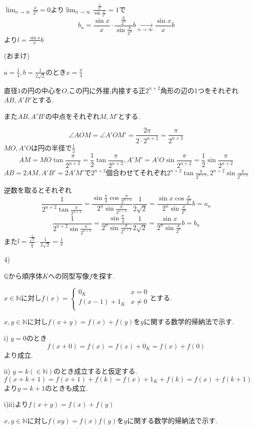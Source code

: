 \documentclass{jsarticle}
\begin{document}
$\displaystyle \lim_{n\to\infty}\frac{x}{2^n}=0$より$\displaystyle \lim_{n\to\infty}\frac{\frac{x}{2^n}}{\sin \frac{x}{2^n}}=1$で
\[b_n= \frac{\sin x}{x}\cdot\frac{\frac{x}{2^n}}{\sin \frac{x}{2^n}}b\xrightarrow[n\to\infty]{} \frac{\sin x}{x}b\]
より$l=\frac{\sin x}{x}b$

(おまけ)

$a=\frac{1}{4},b=\frac{1}{2\sqrt{2}}$のとき$x=\frac{\pi}{4}$

直径$1$の円の中心を$O$,この円に外接,内接する正$2^{n+2}$角形の辺の1つをそれぞれ$AB,A'B'$とする.

また$AB,A'B'$の中点をそれぞれ$M,M'$とする.

\[\angle AOM = \angle A'OM' = \frac{2\pi}{2\cdot 2^{n+2}}=\frac{\pi}{2^{n+2}}\]
$MO,A'O$は円の半径で$\frac{1}{2}$
\[AM=MO\tan \frac{\pi}{2^{n+2}} = \frac{1}{2}\tan\frac{\pi}{2^{n+2}},A'M' =A'O\sin \frac{\pi}{2^{n+2}} = \frac{1}{2}\sin\frac{\pi}{2^{n+2}}\]
$AB=2AM,A'B'=2A'M'$で$2^{n+2}$個合わせてそれぞれ$2^{n+2}\tan\frac{\pi}{2^{n+2}},2^{n+2}\sin\frac{\pi}{2^{n+2}}$

逆数を取るとそれぞれ
\[\frac{1}{2^{n+2}\tan\frac{\pi}{ 2^{n+2}}}=\frac{\sin \frac{\pi}{4}\cos\frac{\pi}{2^{n+2}}}{2^n\sin\frac{\pi}{2^{n+2}}}\frac{1}{2\sqrt{2}}=\frac{\sin x\cos \frac{x}{2^n}}{2^n\sin\frac{x}{2^n}}b=a_n\]
\[\frac{1}{2^{n+2}\sin\frac{\pi}{ 2^{n+2}}}=\frac{\sin \frac{\pi}{4}}{2^n\sin\frac{\pi}{2^{n+2}}}\frac{1}{2\sqrt{2}}=\frac{\sin x}{2^n\sin\frac{x}{2^n}}b=b_n\]
また$l=\frac{\frac{1}{\sqrt{2}}}{\frac{\pi}{4}}\cdot \frac{1}{2\sqrt{2}}=\frac{1}{\pi}$

4)

$\mathbb{Q}$から順序体$K$への同型写像$f$を探す.

$x\in \mathbb{N}$に対し$f(x)=\begin{cases}
0_K & x=0\\
f(x-1)+1_K & x\neq 0\\ 
\end{cases}$とする.

$x,y\in\mathbb{N}$に対し$f(x+y)=f(x)+f(y)$を$y$に関する数学的帰納法で示す.

i) $y=0$のとき
\[f(x+0)=f(x)=f(x)+0_K=f(x)+f(0)\]
より成立.

ii) $y=k(\in\mathbb{N})$のとき成立すると仮定する.
\[f(x+k+1)=f(x+1)+f(k)=f(x)+1_K+f(k)=f(x)+f(k+1)\]
より$y=k+1$のときも成立.

i)ii)より$f(x+y)=f(x)+f(y)$

$x,y\in\mathbb{N}$に対し$f(xy)=f(x)f(y)$を$y$に関する数学的帰納法で示す.
\end{document}
